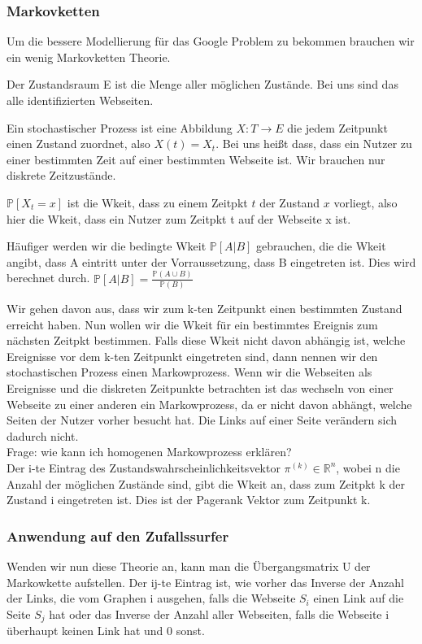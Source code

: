\documentclass[]{article}
\begin{document}
\subsubsection{Markovketten}
Um die bessere Modellierung für das Google Problem zu bekommen brauchen wir ein wenig Markovketten Theorie. 

Der Zustandsraum E ist die Menge aller möglichen Zustände. Bei uns sind das alle identifizierten Webseiten.

 Ein stochastischer Prozess ist eine Abbildung $X:T \rightarrow E$ die jedem Zeitpunkt einen Zustand zuordnet, also $X(t)=X_t$. Bei uns heißt dass, dass ein Nutzer zu einer bestimmten Zeit auf einer bestimmten Webseite ist.  Wir brauchen nur diskrete Zeitzustände. 
 
 $\mathbb{P}[X_t=x]$ ist die Wkeit, dass zu einem Zeitpkt $t$ der Zustand $x$ vorliegt, also hier die Wkeit, dass ein Nutzer zum Zeitpkt t auf der Webseite x ist. 
 
Häufiger werden wir die bedingte Wkeit $\mathbb{P}[A|B]$ gebrauchen, die die Wkeit angibt, dass A eintritt unter der Vorraussetzung, dass B eingetreten ist. Dies wird berechnet durch. $\mathbb{P}[A|B]= \frac{\mathbb{P}(A \cup B)}{\mathbb{P}(B)}$

Wir gehen davon aus, dass wir zum k-ten Zeitpunkt einen bestimmten Zustand erreicht haben. Nun wollen wir die Wkeit für ein bestimmtes Ereignis zum nächsten Zeitpkt bestimmen. Falls diese Wkeit nicht davon abhängig ist, welche Ereignisse vor dem k-ten Zeitpunkt eingetreten sind, dann nennen wir den stochastischen Prozess einen Markowprozess. Wenn wir die Webseiten als Ereignisse und die diskreten Zeitpunkte betrachten ist das wechseln von einer Webseite zu einer anderen ein Markowprozess, da er nicht davon abhängt, welche Seiten der Nutzer vorher besucht hat. Die Links auf einer Seite verändern sich dadurch nicht. \\

Frage: wie kann ich homogenen Markowprozess erklären? \\

Der i-te Eintrag des Zustandswahrscheinlichkeitsvektor $\pi^{(k)} \in \mathbb{R}^n$, wobei n die Anzahl der möglichen Zustände sind, gibt die Wkeit an, dass zum Zeitpkt k der Zustand i eingetreten ist.  Dies ist der Pagerank Vektor zum Zeitpunkt k. 

\subsubsection{Anwendung auf den Zufallssurfer}
Wenden wir nun diese Theorie an, kann man die Übergangsmatrix U der Markowkette aufstellen. Der ij-te Eintrag ist, wie vorher das Inverse der Anzahl der Links, die vom Graphen i ausgehen, falls die Webseite $S_i$ einen Link auf die Seite $S_j$ hat oder das Inverse der Anzahl aller Webseiten, falls die Webseite i überhaupt keinen Link hat und 0 sonst. 
\end{document}
